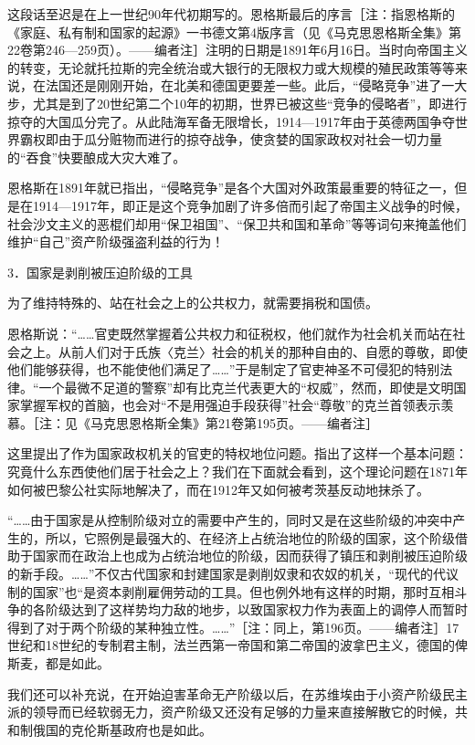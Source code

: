 \documentclass[UTF8, 12pt, a4paper]{ctexrep}
\begin{document}
这段话至迟是在上一世纪90年代初期写的。恩格斯最后的序言［注：指恩格斯的《家庭、私有制和国家的起源》一书德文第4版序言（见《马克思恩格斯全集》第22卷第246—259页）。——编者注］注明的日期是1891年6月16日。当时向帝国主义的转变，无论就托拉斯的完全统治或大银行的无限权力或大规模的殖民政策等等来说，在法国还是刚刚开始，在北美和德国更要差一些。此后，“侵略竞争”进了一大步，尤其是到了20世纪第二个10年的初期，世界已被这些“竞争的侵略者”，即进行掠夺的大国瓜分完了。从此陆海军备无限增长，1914—1917年由于英德两国争夺世界霸权即由于瓜分赃物而进行的掠夺战争，使贪婪的国家政权对社会一切力量的“吞食”快要酿成大灾大难了。

恩格斯在1891年就已指出，“侵略竞争”是各个大国对外政策最重要的特征之一，但是在1914—1917年，即正是这个竞争加剧了许多倍而引起了帝国主义战争的时候，社会沙文主义的恶棍们却用“保卫祖国”、“保卫共和国和革命”等等词句来掩盖他们维护“自己”资产阶级强盗利益的行为！

3．国家是剥削被压迫阶级的工具

为了维持特殊的、站在社会之上的公共权力，就需要捐税和国债。

恩格斯说：“……官吏既然掌握着公共权力和征税权，他们就作为社会机关而站在社会之上。从前人们对于氏族〈克兰〉社会的机关的那种自由的、自愿的尊敬，即使他们能够获得，也不能使他们满足了……”于是制定了官吏神圣不可侵犯的特别法律。“一个最微不足道的警察”却有比克兰代表更大的“权威”，然而，即使是文明国家掌握军权的首脑，也会对“不是用强迫手段获得”社会“尊敬”的克兰首领表示羡慕。［注：见《马克思恩格斯全集》第21卷第195页。——编者注］

这里提出了作为国家政权机关的官吏的特权地位问题。指出了这样一个基本问题：究竟什么东西使他们居于社会之上？我们在下面就会看到，这个理论问题在1871年如何被巴黎公社实际地解决了，而在1912年又如何被考茨基反动地抹杀了。

“……由于国家是从控制阶级对立的需要中产生的，同时又是在这些阶级的冲突中产生的，所以，它照例是最强大的、在经济上占统治地位的阶级的国家，这个阶级借助于国家而在政治上也成为占统治地位的阶级，因而获得了镇压和剥削被压迫阶级的新手段。……”不仅古代国家和封建国家是剥削奴隶和农奴的机关，“现代的代议制的国家”也“是资本剥削雇佣劳动的工具。但也例外地有这样的时期，那时互相斗争的各阶级达到了这样势均力敌的地步，以致国家权力作为表面上的调停人而暂时得到了对于两个阶级的某种独立性。……”［注：同上，第196页。——编者注］17世纪和18世纪的专制君主制，法兰西第一帝国和第二帝国的波拿巴主义，德国的俾斯麦，都是如此。

我们还可以补充说，在开始迫害革命无产阶级以后，在苏维埃由于小资产阶级民主派的领导而已经软弱无力，资产阶级又还没有足够的力量来直接解散它的时候，共和制俄国的克伦斯基政府也是如此。
\end{document}
